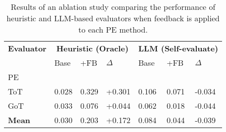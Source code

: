 \begin{table}[!h]
\caption{Results of an ablation study comparing the performance of heuristic and LLM-based evaluators when feedback is applied to each PE method.}
\label{tab:self_evaluation}
\begin{tabular}{p{1.5cm}|p{0.73cm}p{0.73cm}p{0.73cm}|p{0.73cm}p{0.73cm}p{0.73cm}}
\toprule
\textbf{Evaluator} & \multicolumn{3}{c|}{\textbf{Heuristic (Oracle)}} & \multicolumn{3}{c}{\textbf{LLM (Self-evaluate)}} \\
 & Base & +FB & $\Delta{}$ & Base & +FB & $\Delta{}$ \\
PE &  &  &  &  &  &  \\
\midrule
ToT & 0.028 & 0.329 & +0.301 & 0.106 & 0.071 & -0.034 \\
GoT & 0.033 & 0.076 & +0.044 & 0.062 & 0.018 & -0.044 \\
\midrule
\textbf{Mean} & 0.030 & 0.203 & +0.172 & 0.084 & 0.044 & -0.039 \\
\bottomrule
\end{tabular}
\end{table}